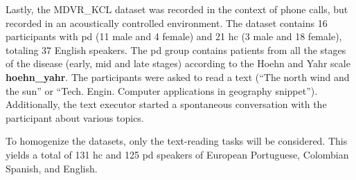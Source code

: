 Lastly, the MDVR\_KCL dataset was recorded in the context of phone calls, but recorded in an acoustically controlled environment. The dataset contains 16 participants with \gls{pd} (11 male and 4 female) and 21 \gls{hc} (3 male and 18 female), totaling 37 English speakers. The \gls{pd} group contains patients from all the stages of the disease (early, mid and late stages) according to the  Hoehn and Yahr scale \textbf{hoehn\_yahr}. The participants were asked to read a text (``The north wind and the sun'' or ``Tech. Engin. Computer applications in geography snippet''). Additionally, the text executor started a spontaneous conversation with the participant about various topics. 

To homogenize the datasets, only the text-reading tasks will be considered. This yields a total of 131 \gls{hc} and 125 \gls{pd} speakers of European Portuguese, Colombian Spanish, and English. 



